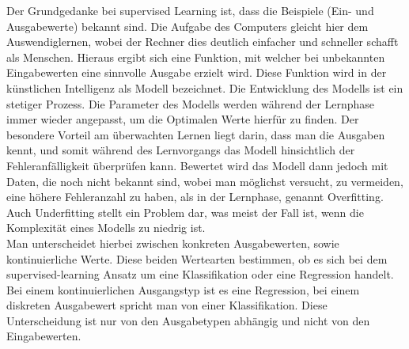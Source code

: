 Der Grundgedanke bei supervised Learning ist, dass die Beispiele (Ein- und
Ausgabewerte) bekannt sind. Die Aufgabe des Computers gleicht hier dem
Auswendiglernen, wobei der Rechner dies deutlich einfacher und schneller
schafft als Menschen. Hieraus ergibt sich eine Funktion, mit welcher bei
unbekannten Eingabewerten eine sinnvolle Ausgabe erzielt wird. Diese Funktion
wird in der künstlichen Intelligenz als Modell bezeichnet. Die Entwicklung des
Modells ist ein stetiger Prozess. Die Parameter des Modells werden während der
Lernphase immer wieder angepasst, um die Optimalen Werte hierfür zu finden. Der
besondere Vorteil am überwachten Lernen liegt darin, dass man die Ausgaben
kennt, und somit während des Lernvorgangs das Modell hinsichtlich der
Fehleranfälligkeit überprüfen kann. Bewertet wird das Modell dann jedoch mit
Daten, die noch nicht bekannt sind, wobei man möglichst versucht, zu vermeiden,
eine höhere Fehleranzahl zu haben, als in der Lernphase, genannt Overfitting.
Auch Underfitting stellt ein Problem dar, was meist der Fall ist, wenn die
Komplexität eines Modells zu niedrig ist.\cite{lanquillon2019grundzuge}\\ 
Man unterscheidet hierbei zwischen konkreten Ausgabewerten, sowie kontinuierliche
Werte. Diese beiden Wertearten bestimmen, ob es sich bei dem
supervised-learning Ansatz um eine Klassifikation oder eine Regression handelt.
Bei einem kontinuierlichen Ausgangstyp ist es eine Regression, bei einem
diskreten Ausgabewert spricht man von einer Klassifikation. Diese
Unterscheidung ist nur von den Ausgabetypen abhängig und nicht von den
Eingabewerten.\cite{matzka2021unuberwachtes}\\
